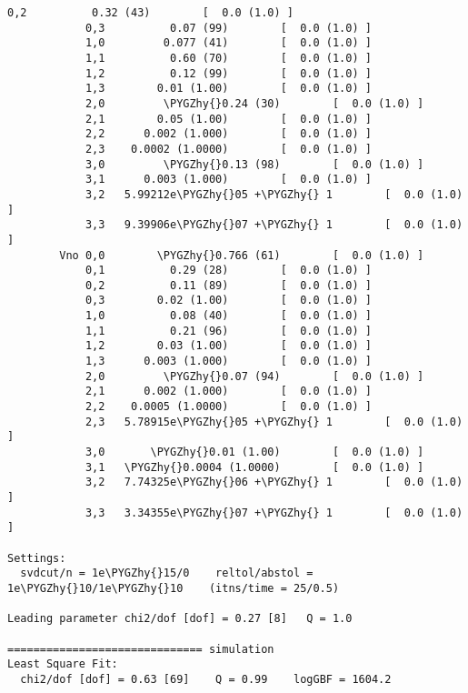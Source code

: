 \documentclass[letterpaper,10pt,english]{sphinxmanual}
\def\PYGZhy{\char`\-}
\begin{document}
\begin{itemize}
\begin{Verbatim}[commandchars=\\\{\}]
            0,2          0.32 (43)        [  0.0 (1.0) ]  
            0,3          0.07 (99)        [  0.0 (1.0) ]  
            1,0         0.077 (41)        [  0.0 (1.0) ]  
            1,1          0.60 (70)        [  0.0 (1.0) ]  
            1,2          0.12 (99)        [  0.0 (1.0) ]  
            1,3        0.01 (1.00)        [  0.0 (1.0) ]  
            2,0         \PYGZhy{}0.24 (30)        [  0.0 (1.0) ]  
            2,1        0.05 (1.00)        [  0.0 (1.0) ]  
            2,2      0.002 (1.000)        [  0.0 (1.0) ]  
            2,3    0.0002 (1.0000)        [  0.0 (1.0) ]  
            3,0         \PYGZhy{}0.13 (98)        [  0.0 (1.0) ]  
            3,1      0.003 (1.000)        [  0.0 (1.0) ]  
            3,2   5.99212e\PYGZhy{}05 +\PYGZhy{} 1        [  0.0 (1.0) ]  
            3,3   9.39906e\PYGZhy{}07 +\PYGZhy{} 1        [  0.0 (1.0) ]  
        Vno 0,0        \PYGZhy{}0.766 (61)        [  0.0 (1.0) ]  
            0,1          0.29 (28)        [  0.0 (1.0) ]  
            0,2          0.11 (89)        [  0.0 (1.0) ]  
            0,3        0.02 (1.00)        [  0.0 (1.0) ]  
            1,0          0.08 (40)        [  0.0 (1.0) ]  
            1,1          0.21 (96)        [  0.0 (1.0) ]  
            1,2        0.03 (1.00)        [  0.0 (1.0) ]  
            1,3      0.003 (1.000)        [  0.0 (1.0) ]  
            2,0         \PYGZhy{}0.07 (94)        [  0.0 (1.0) ]  
            2,1      0.002 (1.000)        [  0.0 (1.0) ]  
            2,2    0.0005 (1.0000)        [  0.0 (1.0) ]  
            2,3   5.78915e\PYGZhy{}05 +\PYGZhy{} 1        [  0.0 (1.0) ]  
            3,0       \PYGZhy{}0.01 (1.00)        [  0.0 (1.0) ]  
            3,1   \PYGZhy{}0.0004 (1.0000)        [  0.0 (1.0) ]  
            3,2   7.74325e\PYGZhy{}06 +\PYGZhy{} 1        [  0.0 (1.0) ]  
            3,3   3.34355e\PYGZhy{}07 +\PYGZhy{} 1        [  0.0 (1.0) ]  

Settings:
  svdcut/n = 1e\PYGZhy{}15/0    reltol/abstol = 1e\PYGZhy{}10/1e\PYGZhy{}10    (itns/time = 25/0.5)

Leading parameter chi2/dof [dof] = 0.27 [8]   Q = 1.0

============================== simulation
Least Square Fit:
  chi2/dof [dof] = 0.63 [69]    Q = 0.99    logGBF = 1604.2


\end{Verbatim}
\end{itemize}
\end{document}
